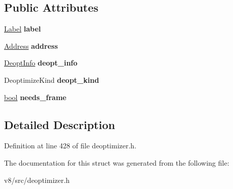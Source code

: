 \subsection*{Public Attributes}
\begin{DoxyCompactItemize}
\item 
\mbox{\label{structv8_1_1internal_1_1Deoptimizer_1_1JumpTableEntry_a773518a70aa1fc7bb2522f4f32aa7061}} 
\mbox{\hyperlink{classv8_1_1internal_1_1Label}{Label}} {\bfseries label}
\item 
\mbox{\label{structv8_1_1internal_1_1Deoptimizer_1_1JumpTableEntry_a05e545ad11c8aacddc3e2043f5436312}} 
\mbox{\hyperlink{classuintptr__t}{Address}} {\bfseries address}
\item 
\mbox{\label{structv8_1_1internal_1_1Deoptimizer_1_1JumpTableEntry_ad341147e4234d33130c4187b4edde76d}} 
\mbox{\hyperlink{structv8_1_1internal_1_1Deoptimizer_1_1DeoptInfo}{Deopt\+Info}} {\bfseries deopt\+\_\+info}
\item 
\mbox{\label{structv8_1_1internal_1_1Deoptimizer_1_1JumpTableEntry_a2b83f1780f4f425c67fe06b7657ff4cd}} 
Deoptimize\+Kind {\bfseries deopt\+\_\+kind}
\item 
\mbox{\label{structv8_1_1internal_1_1Deoptimizer_1_1JumpTableEntry_a4861a397798dc81c0db98e2f621480bf}} 
\mbox{\hyperlink{classbool}{bool}} {\bfseries needs\+\_\+frame}
\end{DoxyCompactItemize}


\subsection{Detailed Description}


Definition at line 428 of file deoptimizer.\+h.



The documentation for this struct was generated from the following file\+:\begin{DoxyCompactItemize}
\item 
v8/src/deoptimizer.\+h\end{DoxyCompactItemize}
